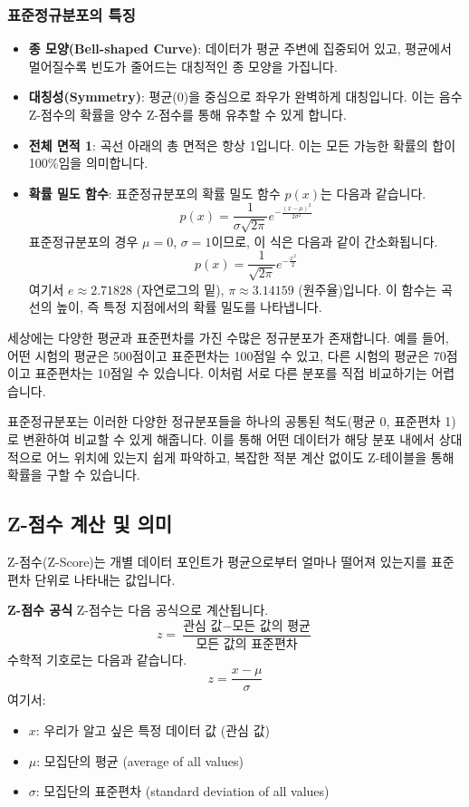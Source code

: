 \documentclass[11pt,a4paper]{book}
\theoremstyle{definition}
\begin{document}
\subsubsection*{표준정규분포의 특징}
\begin{itemize}
    \item \textbf{종 모양(Bell-shaped Curve)}: 데이터가 평균 주변에 집중되어 있고, 평균에서 멀어질수록 빈도가 줄어드는 대칭적인 종 모양을 가집니다.
    \item \textbf{대칭성(Symmetry)}: 평균(0)을 중심으로 좌우가 완벽하게 대칭입니다. 이는 음수 Z-점수의 확률을 양수 Z-점수를 통해 유추할 수 있게 합니다.
    \item \textbf{전체 면적 1}: 곡선 아래의 총 면적은 항상 1입니다. 이는 모든 가능한 확률의 합이 100\%임을 의미합니다.
    \item \textbf{확률 밀도 함수}: 표준정규분포의 확률 밀도 함수 $p(x)$는 다음과 같습니다.
    \[ p(x) = \frac{1}{\sigma\sqrt{2\pi}} e^{-\frac{(x-\mu)^2}{2\sigma^2}} \]
    표준정규분포의 경우 $\mu=0$, $\sigma=1$이므로, 이 식은 다음과 같이 간소화됩니다.
    \[ p(x) = \frac{1}{\sqrt{2\pi}} e^{-\frac{x^2}{2}} \]
    여기서 $e \approx 2.71828$ (자연로그의 밑), $\pi \approx 3.14159$ (원주율)입니다. 이 함수는 곡선의 높이, 즉 특정 지점에서의 확률 밀도를 나타냅니다.
\end{itemize}

\begin{tcolorbox}[title={\textbf{왜 표준정규분포가 필요한가?}, colback=lightgray, colframe=black!75}]
세상에는 다양한 평균과 표준편차를 가진 수많은 정규분포가 존재합니다. 예를 들어, 어떤 시험의 평균은 500점이고 표준편차는 100점일 수 있고, 다른 시험의 평균은 70점이고 표준편차는 10점일 수 있습니다. 이처럼 서로 다른 분포를 직접 비교하기는 어렵습니다.

표준정규분포는 이러한 다양한 정규분포들을 하나의 공통된 척도(평균 0, 표준편차 1)로 변환하여 비교할 수 있게 해줍니다. 이를 통해 어떤 데이터가 해당 분포 내에서 상대적으로 어느 위치에 있는지 쉽게 파악하고, 복잡한 적분 계산 없이도 Z-테이블을 통해 확률을 구할 수 있습니다.
\end{tcolorbox}

\subsection{Z-점수 계산 및 의미}
Z-점수(Z-Score)는 개별 데이터 포인트가 평균으로부터 얼마나 떨어져 있는지를 표준편차 단위로 나타내는 값입니다.

\begin{definitionbox}
\textbf{Z-점수 공식}
Z-점수는 다음 공식으로 계산됩니다.
\[ z = \frac{\text{관심 값} - \text{모든 값의 평균}}{\text{모든 값의 표준편차}} \]
수학적 기호로는 다음과 같습니다.
\[ z = \frac{x - \mu}{\sigma} \]
여기서:
\begin{itemize}
    \item $x$: 우리가 알고 싶은 특정 데이터 값 (관심 값)
    \item $\mu$: 모집단의 평균 (average of all values)
    \item $\sigma$: 모집단의 표준편차 (standard deviation of all values)
\end{itemize}
\end{definitionbox}
\end{document}
